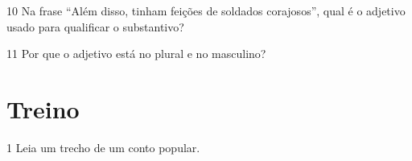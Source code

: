 \num{10} Na frase ``Além disso, tinham feições de soldados corajosos'', qual é o
adjetivo usado para qualificar o substantivo?


\num{11} Por que o adjetivo está no plural e no masculino?

\section*{Treino}

\num{1} Leia um trecho de um conto popular.

